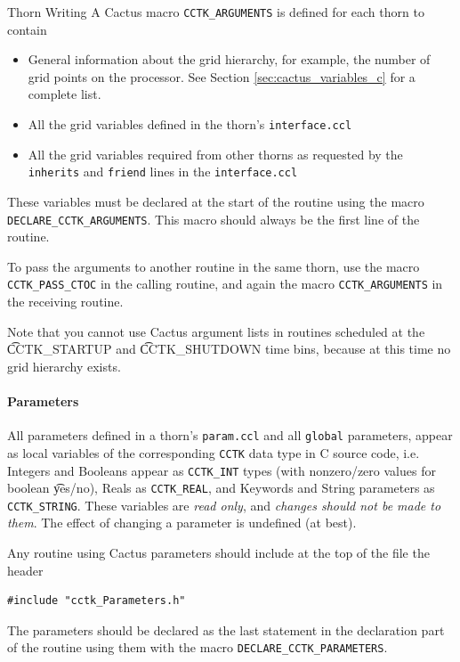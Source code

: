 \begin{cactuspart}{Thorn Writing}
A Cactus macro \texttt{CCTK\_ARGUMENTS} is defined for each thorn
to contain
\begin{itemize}
\item General information about the grid hierarchy, for example, the
number of grid points on the processor. See Section \ref{sec:cactus_variables_c}
for a complete list.
\item All the grid variables defined in the thorn's \texttt{interface.ccl}
\item All the grid variables required from other thorns as requested by
      the \texttt{inherits} and \texttt{friend} lines in the \texttt{interface.ccl}
\end{itemize}
These variables must be declared at the start of the routine using
the macro \texttt{DECLARE\_CCTK\_ARGUMENTS}. This macro should always be the
first line of the routine.

To pass the arguments to another routine in the same thorn, use the macro
\texttt{CCTK\_PASS\_CTOC} in the calling routine, and again the macro
\texttt{CCTK\_ARGUMENTS} in the receiving routine.

Note that you cannot use Cactus argument lists in routines scheduled at the
{\t CCTK\_STARTUP} and {\t CCTK\_SHUTDOWN} time bins, because at this time
no grid hierarchy exists.


\paragraph{Parameters}

All parameters defined in a thorn's \texttt{param.ccl} and all \texttt{global}
parameters, appear as local variables of the corresponding \texttt{CCTK} data type
in C source code, i.e. Integers and Booleans appear as \texttt{CCTK\_INT} types
(with nonzero/zero values for boolean {\t yes/no}), Reals as
\texttt{CCTK\_REAL}, and Keywords and String parameters as \texttt{CCTK\_STRING}.
These variables are \emph{read only}, and \emph{changes should not be made to
them}.  The effect of changing a parameter is undefined (at best).

Any routine using Cactus parameters should include at
the top of the file the header
\begin{verbatim}
#include "cctk_Parameters.h"
\end{verbatim}

The parameters should be declared as the last statement in the declaration part
of the routine using them with the macro \texttt{DECLARE\_CCTK\_PARAMETERS}.


\end{cactuspart}
